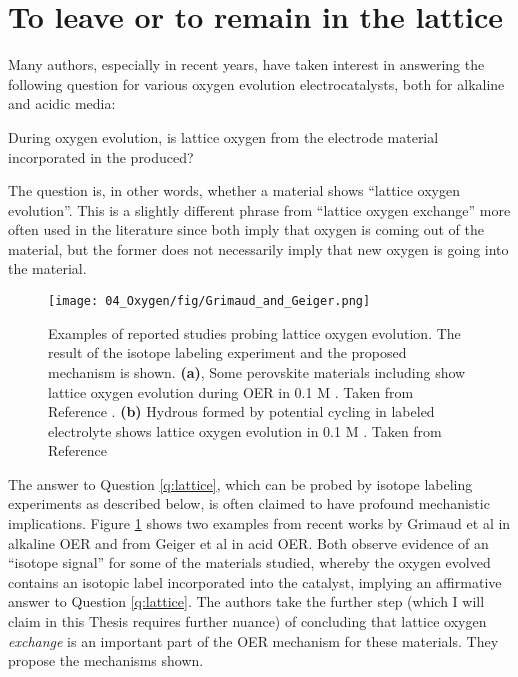 

\section{To leave or to remain in the lattice}\label{sec:lattice_O}

Many authors, especially in recent years, have taken interest in answering the following question for various oxygen evolution electrocatalysts, both for alkaline and acidic media:
\begin{question}
During oxygen evolution, is lattice oxygen from the electrode material incorporated in the  produced? \label{q:lattice}
\end{question}
The question is, in other words, whether a material shows ``lattice oxygen evolution''. This is a slightly different phrase from ``lattice oxygen exchange'' more often used in the literature since both imply that oxygen is coming out of the material, but the former does not necessarily imply that new oxygen is going into the material.

\begin{figure}[h!]
	\centering
	\texttt{[image: 04\_Oxygen/fig/Grimaud\_and\_Geiger.png]}
	\caption{Examples of reported studies probing lattice oxygen evolution. The result of the isotope labeling experiment and the proposed mechanism is shown. \textbf{(a)}, Some perovskite materials including  show lattice oxygen evolution during OER in 0.1 M . Taken from Reference . \textbf{(b)} Hydrous  formed by potential cycling  in labeled electrolyte shows lattice oxygen evolution in 0.1 M . Taken from Reference }
	\label{fig:GG}
\end{figure}

The answer to Question \ref{q:lattice}, which can be probed by isotope labeling experiments as described below, is often claimed to have profound mechanistic implications. Figure \ref{fig:GG} shows two examples from recent works by Grimaud et al\cite{Grimaud2017} in alkaline OER and from Geiger et al\cite{Geiger2018} in acid OER. Both observe evidence of an ``isotope signal'' for some of the materials studied, whereby the oxygen evolved contains an isotopic label incorporated into the catalyst, implying an affirmative answer to Question \ref{q:lattice}. The authors take the further step (which I will claim in this Thesis requires further nuance) of concluding that lattice oxygen \textit{exchange} is an important part of the OER mechanism for these materials. They propose the mechanisms shown.

